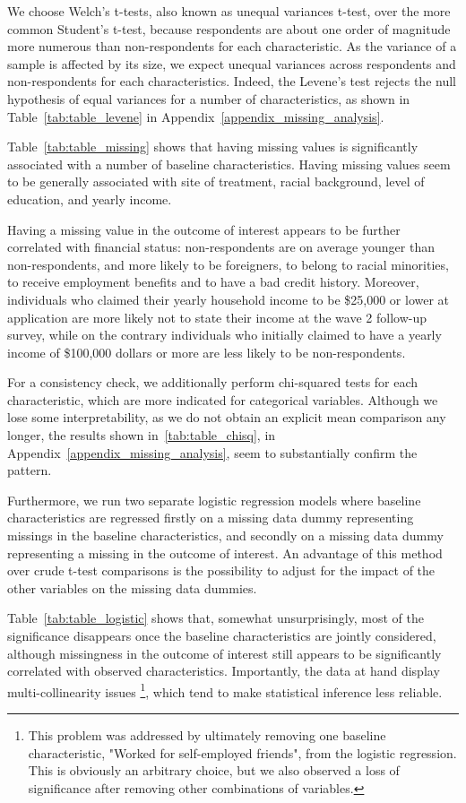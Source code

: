 We choose Welch's t-tests, also known as unequal variances t-test, over the more common Student's t-test, because respondents are about one order of magnitude more numerous than non-respondents for each characteristic. As the variance of a sample is affected by its size, we expect unequal variances across respondents and non-respondents for each characteristics. Indeed, the Levene's test rejects the null hypothesis of equal variances for a number of characteristics, as shown in Table~\ref{tab:table_levene} in Appendix~\ref{appendix_missing_analysis}.

Table~\ref{tab:table_missing} shows that having missing values is significantly associated with a number of baseline characteristics. Having missing values seem to be generally associated with site of treatment, racial background, level of education, and yearly income.

Having a missing value in the outcome of interest appears to be further correlated with financial status: non-respondents are on average younger than non-respondents, and more likely to be foreigners, to belong to racial minorities, to receive employment benefits and to have a bad credit history. Moreover, individuals who claimed their yearly household income to be \$25,000 or lower at application are more likely not to state their income at the wave 2 follow-up survey, while on the contrary individuals who initially claimed to have a yearly income of \$100,000 dollars or more are less likely to be non-respondents.

For a consistency check, we additionally perform chi-squared tests for each characteristic, which are more indicated for categorical variables. Although we lose some interpretability, as we do not obtain an explicit mean comparison any longer, the results shown in~\ref{tab:table_chisq}, in Appendix~\ref{appendix_missing_analysis}, seem to substantially confirm the pattern.

Furthermore, we run two separate logistic regression models where baseline characteristics are regressed firstly on a missing data dummy representing missings in the baseline characteristics, and secondly on a missing data dummy representing a missing in the outcome of interest. An advantage of this method over crude t-test comparisons is the possibility to adjust for the impact of the other variables on the missing data dummies.

Table~\ref{tab:table_logistic} shows that, somewhat unsurprisingly, most of the significance disappears once the baseline characteristics are jointly considered, although missingness in the outcome of interest still appears to be significantly correlated with observed characteristics. Importantly, the data at hand display multi-collinearity issues \footnote{This problem was addressed by ultimately removing one baseline characteristic, "Worked for self-employed friends", from the logistic regression. This is obviously an arbitrary choice, but we also observed a loss of significance after removing other combinations of variables.}, which tend to make statistical inference less reliable.

